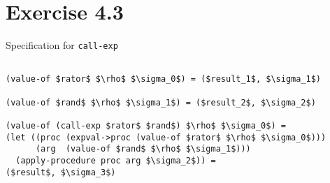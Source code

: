 \section*{Exercise 4.3}

Specification for \texttt{call-exp}

\begin{center}
\begin{lstlisting}[mathescape]

(value-of $rator$ $\rho$ $\sigma_0$) = ($result_1$, $\sigma_1$)

(value-of $rand$ $\rho$ $\sigma_1$) = ($result_2$, $\sigma_2$)

(value-of (call-exp $rator$ $rand$) $\rho$ $\sigma_0$) =
(let ((proc (expval->proc (value-of $rator$ $\rho$ $\sigma_0$)))
      (arg  (value-of $rand$ $\rho$ $\sigma_1$)))
  (apply-procedure proc arg $\sigma_2$)) =
($result$, $\sigma_3$)
\end{lstlisting}
\end{center}
